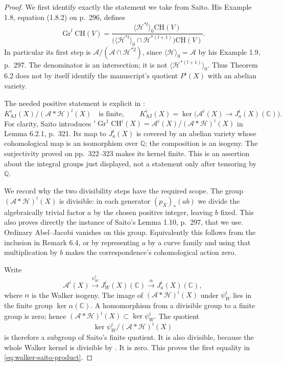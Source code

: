 \begin{proof}
We first identify exactly the statement we take from Saito.
His Example 1.8, equation (1.8.2) on p.~296, defines
\[
 \operatorname{Gr}^{l}\mathrm{CH}(V)
 =\frac{\langle\mathcal H^{*l}\rangle_0\mathrm{CH}(V)}
 {\bigl(\langle\mathcal H^{*l}\rangle_0
                 \cap\mathcal H^{*(l+1)}\bigr)\mathrm{CH}(V)}.
\]
In particular its first step is
$\mathcal A/(\mathcal A\cap\mathcal H^{*2})$, since
$\langle\mathcal H\rangle_0=\mathcal A$ by his Example 1.9,
p.~297. The denominator is an intersection; it is not
$\langle\mathcal H^{*(l+1)}\rangle_0$.
Thus Theorem 6.2 does not by itself identify the manuscript's
quotient $P^i(X)$ with an abelian variety.

The needed positive statement is explicit in
\citet[proof of Theorem 6.2, p.~323; Remark 6.4, p.~325]{cySaito1992}:
\[
 K_{\mathrm{AJ}}^i(X)/(\mathcal A*\mathcal H)^i(X)
 \quad\text{is finite},\qquad
 K_{\mathrm{AJ}}^i(X)=
       \ker\bigl(\mathcal A^i(X)\to J_a^i(X)(\mathbb C)\bigr).
\]
For clarity, Saito introduces
$'\operatorname{Gr}^{1}\mathrm{CH}^i(X)
=\mathcal A^i(X)/(\mathcal A*\mathcal H)^i(X)$ in
Lemma 6.2.1, p.~321. Its map to $J_a^i(X)$ is covered by
an abelian variety whose cohomological map is an isomorphism
over $\mathbb Q$; the composition is an isogeny. The
surjectivity proved on pp.~322--323 makes its kernel finite.
This is an assertion about the integral groups just displayed,
not a statement only after tensoring by $\mathbb Q$.

We record why the two divisibility steps have the required
scope. The group $(\mathcal A*\mathcal H)^i(X)$ is divisible:
in each generator $(p_X)_*(a b)$ we divide the algebraically
trivial factor $a$ by the chosen positive integer, leaving
$b$ fixed. This also proves directly the instance of Saito's
Lemma 1.10, p.~297, that we use. Ordinary Abel--Jacobi
vanishes on this group. Equivalently this follows from the
inclusion in Remark 6.4, or by representing $a$ by a curve
family and using that multiplication by $b$ makes the
correspondence's cohomological action zero.

Write
\[
 \mathcal A^i(X)\xrightarrow{\psi_W^i}J_W^i(X)(\mathbb C)
     \xrightarrow{\alpha}J_a^i(X)(\mathbb C),
\]
where $\alpha$ is the Walker isogeny. The image of
$(\mathcal A*\mathcal H)^i(X)$ under $\psi_W^i$ lies in
the finite group $\ker\alpha(\mathbb C)$. A homomorphism
from a divisible group to a finite group is zero; hence
$(\mathcal A*\mathcal H)^i(X)\subset\ker\psi_W^i$.
The quotient
\[
 \ker\psi_W^i/(\mathcal A*\mathcal H)^i(X)
\]
is therefore a subgroup of Saito's finite quotient. It is
also divisible, because the whole Walker kernel is divisible
by \citet[Theorem 2.3, author p.~12]{cyACMVWalker2022}.
It is zero. This proves the first equality in
\eqref{eq:walker-saito-product}.


\end{proof}
